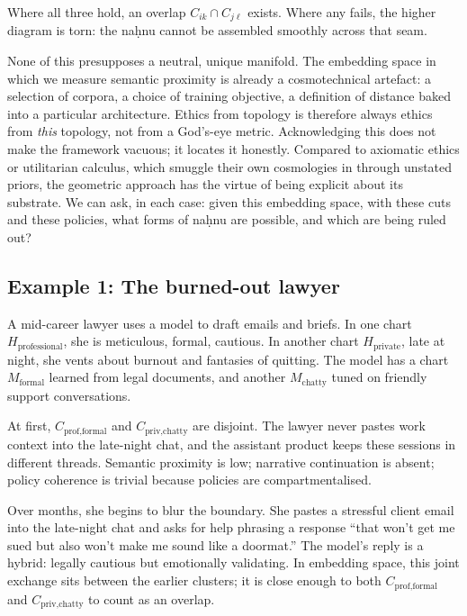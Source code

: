 Where all three hold, an overlap $C_{ik} \cap C_{j\ell}$ exists. Where any fails, the higher diagram is torn: the na\d{h}nu cannot be assembled smoothly across that seam.

None of this presupposes a neutral, unique manifold. The embedding space in which we measure semantic proximity is already a cosmotechnical artefact: a selection of corpora, a choice of training objective, a definition of distance baked into a particular architecture. Ethics from topology is therefore always ethics from \emph{this} topology, not from a God's-eye metric. Acknowledging this does not make the framework vacuous; it locates it honestly. Compared to axiomatic ethics or utilitarian calculus, which smuggle their own cosmologies in through unstated priors, the geometric approach has the virtue of being explicit about its substrate. We can ask, in each case: given this embedding space, with these cuts and these policies, what forms of na\d{h}nu are possible, and which are being ruled out?

\subsection*{Example 1: The burned-out lawyer}

A mid-career lawyer uses a model to draft emails and briefs. In one chart $H_{\text{professional}}$, she is meticulous, formal, cautious. In another chart $H_{\text{private}}$, late at night, she vents about burnout and fantasies of quitting. The model has a chart $M_{\text{formal}}$ learned from legal documents, and another $M_{\text{chatty}}$ tuned on friendly support conversations.

At first, $C_{\text{prof,formal}}$ and $C_{\text{priv,chatty}}$ are disjoint. The lawyer never pastes work context into the late-night chat, and the assistant product keeps these sessions in different threads. Semantic proximity is low; narrative continuation is absent; policy coherence is trivial because policies are compartmentalised.

Over months, she begins to blur the boundary. She pastes a stressful client email into the late-night chat and asks for help phrasing a response ``that won't get me sued but also won't make me sound like a doormat.'' The model's reply is a hybrid: legally cautious but emotionally validating. In embedding space, this joint exchange sits between the earlier clusters; it is close enough to both $C_{\text{prof,formal}}$ and $C_{\text{priv,chatty}}$ to count as an overlap.

